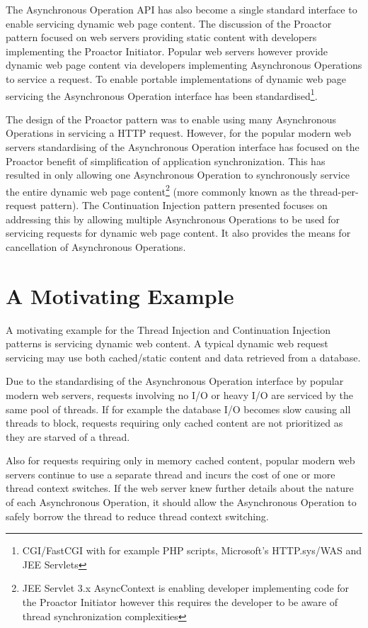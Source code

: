 \documentclass[prodmode]{style/acmlarge}
\begin{document}
The Asynchronous Operation API has also become a single standard interface to
enable servicing dynamic web page content.  The discussion of the Proactor
pattern focused on web servers providing static content with developers
implementing the Proactor Initiator.  Popular web servers however provide
dynamic web page content via developers implementing Asynchronous Operations to
service a request.  To enable portable implementations of dynamic web page
servicing the Asynchronous Operation interface has been
standardised\footnote{CGI/FastCGI with for example PHP scripts, Microsoft's
HTTP.sys/WAS and JEE Servlets}.

The design of the Proactor pattern was to enable using many Asynchronous
Operations in servicing a HTTP request.  However, for the popular modern web
servers standardising of the Asynchronous Operation interface has focused on the
Proactor benefit of simplification of application synchronization.  This has
resulted in only allowing one Asynchronous Operation to synchronously service
the entire dynamic web page content\footnote{JEE Servlet 3.x AsyncContext is
enabling developer implementing code for the Proactor Initiator however this
requires the developer to be aware of thread synchronization complexities} (more
commonly known as the thread-per-request pattern).  The Continuation Injection
pattern presented focuses on addressing this by allowing multiple Asynchronous
Operations to be used for servicing requests for dynamic web page content. It
also provides the means for cancellation of Asynchronous Operations.


\section{A Motivating Example}

A motivating example for the Thread Injection and Continuation Injection
patterns is servicing dynamic web content.  A typical dynamic web request
servicing may use both cached/static content and data retrieved from a database.

Due to the standardising of the Asynchronous Operation interface by popular
modern web servers, requests involving no I/O or heavy I/O are serviced by the
same pool of threads.  If for example the database I/O becomes slow causing all
threads to block, requests requiring only cached content are not prioritized as
they are starved of a thread.

Also for requests requiring only in memory cached content, popular modern web
servers continue to use a separate thread and incurs the cost of one or more
thread context switches.  If the web server knew further details about the
nature of each Asynchronous Operation, it should allow the Asynchronous
Operation to safely borrow the thread to reduce thread context switching.
\end{document}

